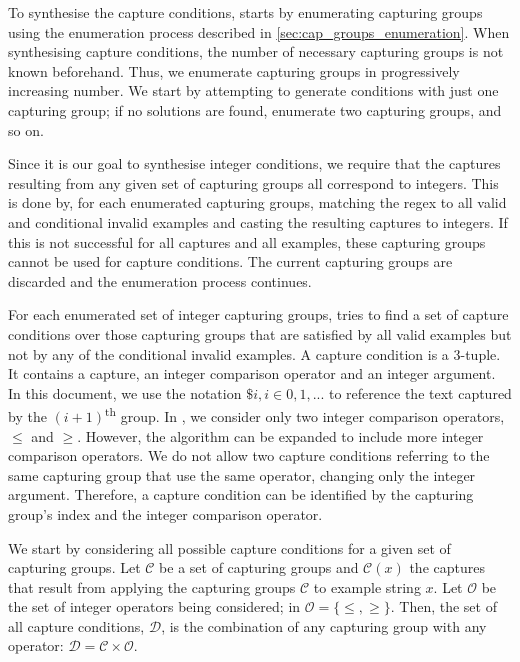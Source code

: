 To synthesise the capture conditions, \Forest starts by enumerating capturing groups using the enumeration process described in \autoref{sec:cap_groups_enumeration}. When synthesising capture conditions, the number of necessary capturing groups is not known beforehand. Thus, we enumerate capturing groups in progressively increasing number. We start by attempting to generate conditions with just one capturing group; if no solutions are found, enumerate two capturing groups, and so on.

Since it is our goal to synthesise integer conditions, we require that the captures resulting from any given set of capturing groups all correspond to integers. This is done by, for each enumerated capturing groups, matching the regex to all valid and conditional invalid examples and casting the resulting captures to integers. If this is not successful for all captures and all examples, these capturing groups cannot be used for capture conditions. The current capturing groups are discarded and the enumeration process continues.


For each enumerated set of integer capturing groups, \Forest tries to find a set of capture conditions over those capturing groups that are satisfied by all valid examples but not by any of the conditional invalid examples.
%
A capture condition is a 3-tuple. It contains a capture, an integer comparison operator and an integer argument. In this document, we use the notation \(\$i, i \in 0, 1, ...\) to reference the text captured by the \((i+1)\)\textsuperscript{th} group. In \Forest, we consider only two integer comparison operators, $\le$ and $\ge$. However, the algorithm can be expanded to include more integer comparison operators. We do not allow two capture conditions referring to the same capturing group that use the same operator, changing only the integer argument. Therefore, a capture condition can be identified by the capturing group's index and the integer comparison operator.

We start by considering all possible capture conditions for a given set of capturing groups. Let \(\mathcal{C}\) be a set of capturing groups and \(\mathcal{C}(x)\) the captures that result from applying the capturing groups \(\mathcal{C}\) to example string \(x\). Let \(\mathcal{O}\) be the set of integer operators being considered; in \Forest \(\mathcal{O} = \{\le, \ge\}\). Then, the set of all capture conditions, \(\mathcal{D}\), is the combination of any capturing group with any operator: \(\mathcal{D} = \mathcal{C} \times \mathcal{O}\).


